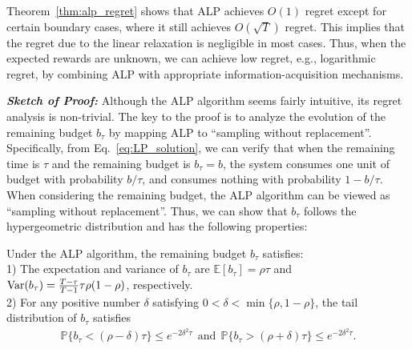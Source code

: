 Theorem~\ref{thm:alp_regret} shows that ALP achieves $O(1)$ regret except for certain boundary cases, where it still achieves $O(\sqrt{T})$ regret. This implies that the regret due to the linear relaxation is negligible in most cases. Thus, when the expected rewards are unknown, we can achieve low regret, e.g., logarithmic regret, by combining ALP with appropriate information-acquisition mechanisms.


{\it \textbf{Sketch of Proof:}} Although the ALP algorithm seems fairly intuitive, its regret analysis is non-trivial. The key to the proof is to analyze the evolution of the remaining budget $b_\tau$ by mapping ALP to ``sampling without replacement''.
Specifically, from Eq.~\eqref{eq:LP_solution}, we can verify that when the remaining time is $\tau$ and the remaining budget is $b_{\tau} = b$,
the system consumes one unit of budget with probability $b/\tau$, and consumes nothing with probability $1-b/\tau$.
When considering the remaining budget, the ALP algorithm can be viewed as  ``sampling  without replacement''.
Thus, we can show that $b_\tau$ follows the hypergeometric distribution \cite{Dubhashi2009Concentration} and has the following properties:
\begin{lemma}\label{thm:alp_to_hypergeo}
Under the ALP algorithm, the remaining budget $b_{\tau}$ satisfies:\\
1) The expectation and variance of  $b_{\tau}$ are $\mathbb{E}[b_{\tau}] = \rho \tau$
and  ${\rm Var}(b_{\tau}) = \frac{T-\tau}{T-1}\tau\rho(1-\rho)$, respectively.\\
2) For any positive  number $\delta$ satisfying $0 < \delta <  \min\{\rho, 1-\rho\}$, the tail distribution of $b_{\tau}$ satisfies
\begin{eqnarray}
\mathbb{P}\{b_{\tau} < (\rho - \delta) \tau\} \leq e^{-2\delta^2 \tau}~~\text{and}~~
\mathbb{P}\{b_{\tau} > (\rho + \delta) \tau\} \leq e^{-2\delta^2 \tau}. \nonumber
\end{eqnarray}
\end{lemma}


